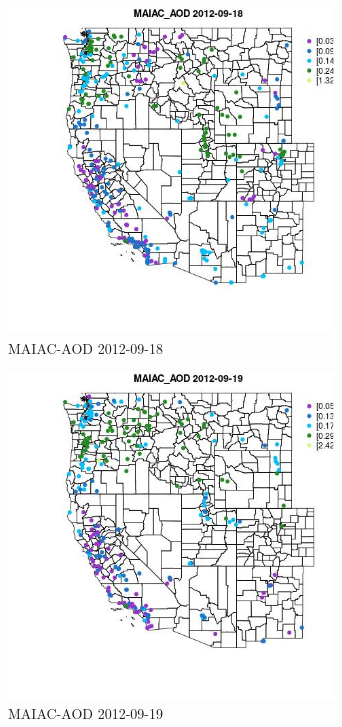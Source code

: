 \begin{figure} 
\centering  
\includegraphics[width=0.77\textwidth]{Code_Outputs/ML_input_report_ML_input_PM25_Step5_part_d_de_duplicated_aves_ML_input_MapObsMAIAC_AOD2012-09-18.jpg} 
\caption{\label{fig:ML_input_report_ML_input_PM25_Step5_part_d_de_duplicated_aves_ML_inputMapObsMAIAC_AOD2012-09-18}MAIAC-AOD 2012-09-18} 
\end{figure} 
 

\begin{figure} 
\centering  
\includegraphics[width=0.77\textwidth]{Code_Outputs/ML_input_report_ML_input_PM25_Step5_part_d_de_duplicated_aves_ML_input_MapObsMAIAC_AOD2012-09-19.jpg} 
\caption{\label{fig:ML_input_report_ML_input_PM25_Step5_part_d_de_duplicated_aves_ML_inputMapObsMAIAC_AOD2012-09-19}MAIAC-AOD 2012-09-19} 
\end{figure} 
 

